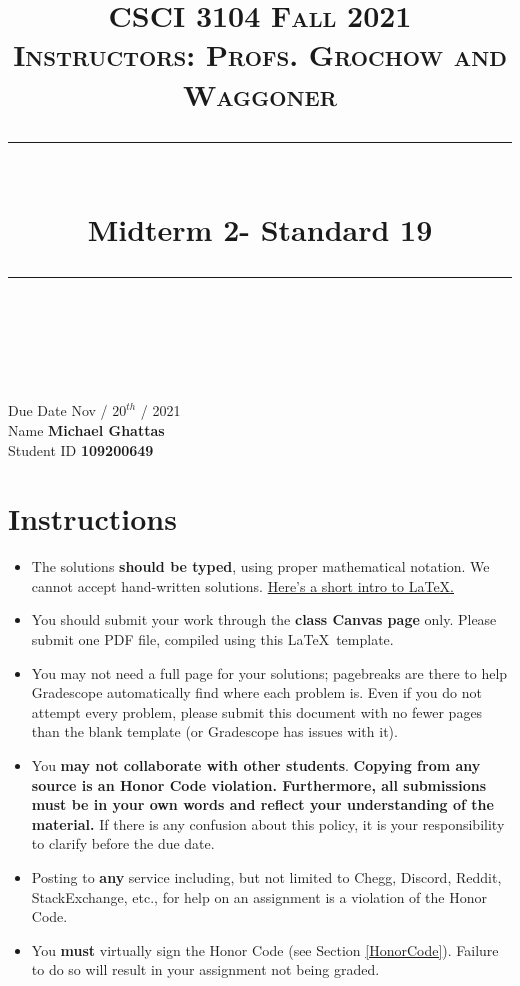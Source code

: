 \documentclass[11pt]{article}
\title{
\normalfont \normalsize 
\textsc{CSCI 3104 Fall 2021 \\ 
Instructors: Profs. Grochow and Waggoner} \\
[10pt] 
\rule{\linewidth}{0.5pt} \\[6pt] 
\huge Midterm 2- Standard 19 \\
\rule{\linewidth}{2pt}  \\[10pt]
}
\date{}
\theoremstyle{definition}
\theoremstyle{definition}
\theoremstyle{definition}
\begin{document}

\maketitle


\noindent
Due Date \dotfill Nov / $20^{th}$ / 2021 \\
Name \dotfill \textbf{Michael Ghattas} \\
Student ID \dotfill \textbf{109200649} \\


\tableofcontents

\section{Instructions}
 \begin{itemize}
	\item The solutions \textbf{should be typed}, using proper mathematical notation. We cannot accept hand-written solutions. \href{http://ece.uprm.edu/~caceros/latex/introduction.pdf}{Here's a short intro to \LaTeX.}
	\item You should submit your work through the \textbf{class Canvas page} only. Please submit one PDF file, compiled using this \LaTeX \ template.
	\item You may not need a full page for your solutions; pagebreaks are there to help Gradescope automatically find where each problem is. Even if you do not attempt every problem, please submit this document with no fewer pages than the blank template (or Gradescope has issues with it).

	\item You \textbf{may not collaborate with other students}. \textbf{Copying from any source is an Honor Code violation. Furthermore, all submissions must be in your own words and reflect your understanding of the material.} If there is any confusion about this policy, it is your responsibility to clarify before the due date. 

	\item Posting to \textbf{any} service including, but not limited to Chegg, Discord, Reddit, StackExchange, etc., for help on an assignment is a violation of the Honor Code.

	\item You \textbf{must} virtually sign the Honor Code (see Section \ref{HonorCode}). Failure to do so will result in your assignment not being graded.
\end{itemize}
\end{document}
